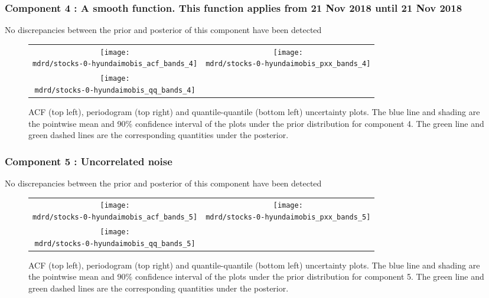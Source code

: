 \documentclass{article} %
\begin{document}
\subsubsection{Component 4 : A smooth function. This function applies from 21 Nov 2018 until 21 Nov 2018}

No discrepancies between the prior and posterior of this component have been detected

\begin{figure}[H]
\newcommand{\wmgd}{0.5\columnwidth}
\newcommand{\hmgd}{3.0cm}
\newcommand{\mdrd}{stocks-0-hyundaimobis}
\newcommand{\mbm}{\hspace{-0.3cm}}
\begin{tabular}{cc}
\mbm \texttt{[image: \\mdrd/stocks-0-hyundaimobis\_acf\_bands\_4]} & \texttt{[image: \\mdrd/stocks-0-hyundaimobis\_pxx\_bands\_4]} \\
\mbm \texttt{[image: \\mdrd/stocks-0-hyundaimobis\_qq\_bands\_4]}
\end{tabular}
\caption{
ACF (top left), periodogram (top right) and quantile-quantile (bottom left) uncertainty plots.
The blue line and shading are the pointwise mean and 90\% confidence interval of the plots under the prior distribution for component 4.
The green line and green dashed lines are the corresponding quantities under the posterior.}
\label{fig:check4}
\end{figure}

\subsubsection{Component 5 : Uncorrelated noise}

No discrepancies between the prior and posterior of this component have been detected

\begin{figure}[H]
\newcommand{\wmgd}{0.5\columnwidth}
\newcommand{\hmgd}{3.0cm}
\newcommand{\mdrd}{stocks-0-hyundaimobis}
\newcommand{\mbm}{\hspace{-0.3cm}}
\begin{tabular}{cc}
\mbm \texttt{[image: \\mdrd/stocks-0-hyundaimobis\_acf\_bands\_5]} & \texttt{[image: \\mdrd/stocks-0-hyundaimobis\_pxx\_bands\_5]} \\
\mbm \texttt{[image: \\mdrd/stocks-0-hyundaimobis\_qq\_bands\_5]}
\end{tabular}
\caption{
ACF (top left), periodogram (top right) and quantile-quantile (bottom left) uncertainty plots.
The blue line and shading are the pointwise mean and 90\% confidence interval of the plots under the prior distribution for component 5.
The green line and green dashed lines are the corresponding quantities under the posterior.}
\label{fig:check5}
\end{figure}
\end{document}
